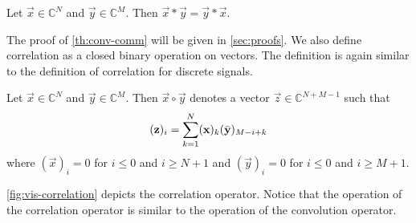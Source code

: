 \documentclass[a4paper, openany, oneside]{memoir}
\begin{document}
\begin{blockTheorem} \label{th:conv-comm}
    Let $\vec{x} \in \mathbb{C}^N$ and $\vec{y} \in \mathbb{C}^M$. Then $\vec{x} \ast \vec{y} = \vec{y} \ast \vec{x}$.
\end{blockTheorem}

The proof of \cref{th:conv-comm} will be given in \cref{sec:proofs}. We also define correlation as a closed binary operation on vectors. The definition is again similar to the definition of correlation for discrete signals.

\begin{blockDefinition}
    Let $\vec{x} \in \mathbb{C}^N$ and $\vec{y} \in \mathbb{C}^M$. Then $\vec{x} \circ \vec{y}$ denotes a vector $\vec{z} \in \mathbb{C}^{N+M-1}$ such that
    \begin{align*}
        (\boldsymbol{\mathbf{z}})_i = \sum_{k=1}^{N} (\boldsymbol{\mathbf{x}})_k (\bar{\boldsymbol{\mathbf{y}}})_{M-i+k}
    \end{align*}
    where $(\vec{x})_i=0$ for $i \le 0$ and $i \ge N+1$ and $(\vec{y})_i=0$ for $i \le 0$ and $i \ge M+1$.
\end{blockDefinition}

\cref{fig:vis-correlation} depicts the correlation operator. Notice that the operation of the correlation operator is similar to the operation of the convolution operator.
\end{document}
